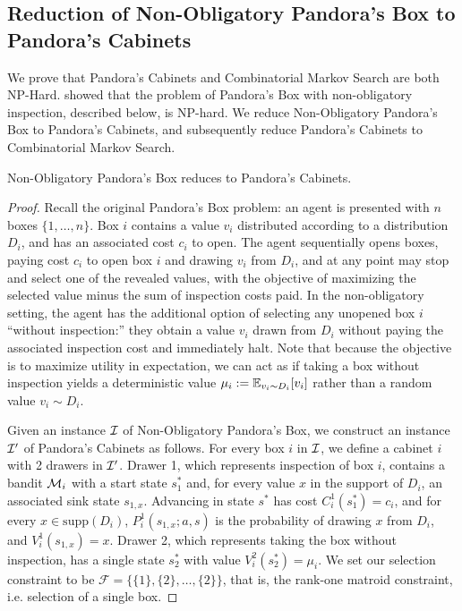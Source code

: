 \subsection{Reduction of Non-Obligatory Pandora's Box to Pandora's Cabinets}  \label{app:hardness}

We prove that Pandora's Cabinets and Combinatorial Markov Search are both NP-Hard.
\citet{fu2023pandora} showed that the problem of Pandora's Box with non-obligatory inspection,
described below, is NP-hard.
We reduce Non-Obligatory Pandora's Box to Pandora's Cabinets, and subsequently reduce Pandora's Cabinets to Combinatorial Markov Search.

\begin{observation}
Non-Obligatory Pandora's Box reduces to Pandora's Cabinets.
\end{observation}
\begin{proof}
Recall the original Pandora's Box problem: an agent is presented with $n$ boxes $\{1,\ldots,n\}$.
Box $i$ contains a value $v_i$ distributed according to a distribution $D_i$, and has an associated cost $c_i$ to open.
The agent sequentially opens boxes, paying cost $c_i$ to open box $i$ and drawing $v_i$ from $D_i$, and at any point may stop and select one of the revealed values,
with the objective of maximizing the selected value minus the sum of inspection costs paid.
In the non-obligatory setting, the agent has the additional option of selecting any unopened box $i$ ``without inspection:''
they obtain a value $v_i$ drawn from $D_i$ without paying the associated inspection cost and immediately halt.
Note that because the objective is to maximize utility in expectation, we can act as if taking a box without inspection yields a deterministic value $\mu_i := \operatorname*{\mathbb{E}}_{v_i \sim D_i}[v_i]$ rather than a random value $v_i \sim D_i$.


Given an instance $\mathcal{I}$ of Non-Obligatory Pandora's Box, we construct an instance $\mathcal{I}'$ of Pandora's Cabinets as follows.
For every box $i$ in $\mathcal{I}$, we define a cabinet $i$ with 2 drawers in $\mathcal{I}'$.
Drawer 1, which represents inspection of box $i$, contains a bandit $\mathcal{M}_i$ with a start state $s_1^*$ and, for every value $x$ in the support of $D_i$, an associated sink state $s_{1,x}$.
Advancing in state $s^*$ has cost $C_i^1(s_1^*)=c_i$, and for every $x\in\mathrm{supp}(D_i)$, $P_i^1(s_{1,x};a,s)$ is the probability of drawing $x$ from $D_i$,
and $V_i^1(s_{1,x})=x$.
Drawer 2, which represents taking the box without inspection, has a single state $s_2^*$ with value $V_i^2(s_2^*)=\mu_i$.
We set our selection constraint to be $\mathcal{F}=\{\{1\},\{2\},\ldots,\{2\}\}$, that is, the rank-one matroid constraint, i.e. selection of a single box.
\end{proof}



